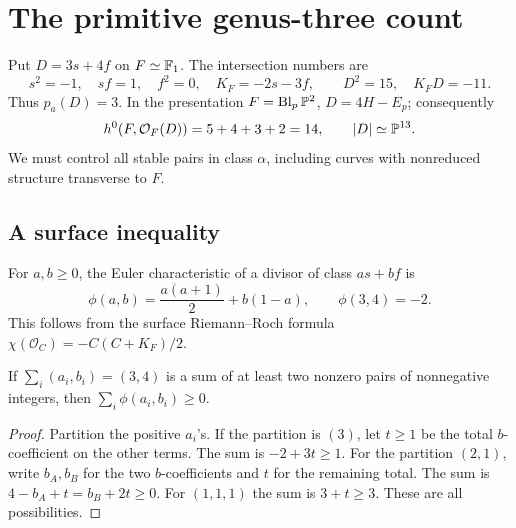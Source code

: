 \section{The primitive genus-three count}\label{sec:pairs}

Put $D=3s+4f$ on $F\simeq\mathbb F_1$. The intersection numbers are
\[
 s^2=-1,\quad sf=1,\quad f^2=0,\quad K_F=-2s-3f,
 \qquad D^2=15,\quad K_FD=-11.
\]
Thus $p_a(D)=3$. In the presentation $F=\operatorname{Bl}_p\mathbb P^2$,
$D=4H-E_p$; consequently
\begin{equation}\label{eq:linear-system}
 h^0(F,\mathcal O_F(D))=5+4+3+2=14,\qquad |D|\simeq\mathbb P^{13}.
\end{equation}
We must control all stable pairs in class $\alpha$, including
curves with nonreduced structure transverse to $F$.

\subsection{A surface inequality}
For $a,b\ge0$, the Euler characteristic of a divisor of class
$as+bf$ is
\begin{equation}\label{eq:phi}
 \phi(a,b)=\frac{a(a+1)}2+b(1-a),
 \qquad \phi(3,4)=-2.
\end{equation}
This follows from the surface Riemann--Roch formula
$\chi(\mathcal O_C)=-C(C+K_F)/2$.

\begin{lemma}\label{lem:split}
If $\sum_i(a_i,b_i)=(3,4)$ is a sum of at least two nonzero
pairs of nonnegative integers, then $\sum_i\phi(a_i,b_i)\ge0$.
\end{lemma}
\begin{proof}
Partition the positive $a_i$'s. If the partition is $(3)$,
let $t\ge1$ be the total $b$-coefficient on the other terms.
The sum is $-2+3t\ge1$. For the partition $(2,1)$, write
$b_A,b_B$ for the two $b$-coefficients and $t$ for the remaining
total. The sum is $4-b_A+t=b_B+2t\ge0$.
For $(1,1,1)$ the sum is $3+t\ge3$. These are all possibilities.
\end{proof}

